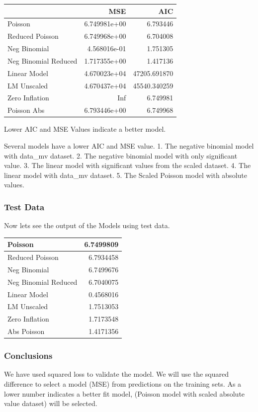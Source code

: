 \documentclass[]{elsarticle} %
\begin{document}
\begin{longtable}[]{@{}lrr@{}}
\toprule
& MSE & AIC\tabularnewline
\midrule
\endhead
Poisson & 6.749981e+00 & 6.793446\tabularnewline
Reduced Poisson & 6.749968e+00 & 6.704008\tabularnewline
Neg Binomial & 4.568016e-01 & 1.751305\tabularnewline
Neg Binomial Reduced & 1.717355e+00 & 1.417136\tabularnewline
Linear Model & 4.670023e+04 & 47205.691870\tabularnewline
LM Unscaled & 4.670437e+04 & 45540.340259\tabularnewline
Zero Inflation & Inf & 6.749981\tabularnewline
Poisson Abs & 6.793446e+00 & 6.749968\tabularnewline
\bottomrule
\end{longtable}

Lower AIC and MSE Values indicate a better model.

Several models have a lower AIC and MSE value. 1. The negative binomial
model with data\_mv dataset. 2. The negative binomial model with only
significant value. 3. The linear model with significant values from the
scaled dataset. 4. The linear model with data\_mv dataset. 5. The Scaled
Poisson model with absolute values.

\hypertarget{test-data}{%
\subsubsection{Test Data}\label{test-data}}

Now lets see the output of the Models using test data.

\begin{tabular}{l|r}
\hline
Poisson & 6.7499809\\
\hline
Reduced Poisson & 6.7934458\\
\hline
Neg Binomial & 6.7499676\\
\hline
Neg Binomial Reduced & 6.7040075\\
\hline
Linear Model & 0.4568016\\
\hline
LM Unscaled & 1.7513053\\
\hline
Zero Inflation & 1.7173548\\
\hline
Abs Poisson & 1.4171356\\
\hline
\end{tabular}

\hypertarget{conclusions}{%
\subsubsection{Conclusions}\label{conclusions}}

We have used squared loss to validate the model. We will use the squared
difference to select a model (MSE) from predictions on the training
sets. As a lower number indicates a better fit model, (Poisson model
with scaled absolute value dataset) will be selected.
\end{document}
